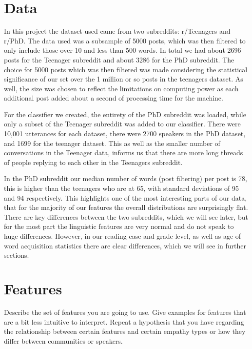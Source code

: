 \documentclass[11pt]{article}
\begin{document}

\section{Data}
In this project the dataset used came from two subreddits: r/Teenagers and r/PhD. The data used was a subsample of 5000 posts, which was then filtered to only include those over 10 and less than 500 words. In total we had about 2696 posts for the Teenager subreddit and about 3286 for the PhD subreddit. The choice for 5000 posts which was then filtered was made considering the statistical significance of our set over the 1 million or so posts in the teenagers dataset. As well, the size was chosen to reflect the limitations on computing power as each additional post added about a second of processing time for the machine. 


For the classifier we created, the entirety of the PhD subreddit was loaded, while only a subset of the Teenager subreddit was added to our classifier. There were 10,001 utterances for each dataset, there were 2700 speakers in the PhD dataset, and 1699 for the teenager dataset. This as well as the smaller number of conversations in the Teenager data, informs us that there are more long threads of people replying to each other in the Teenagers subreddit. 



In the PhD subreddit our median number of words (post filtering) per post is 78, this is higher than the teenagers who are at 65, with standard  deviations of 95 and 94 respectively. This highlights one of the most interesting parts of our data, that for the majority of our features the overall distributions are surprisingly flat. There are key differences between the two subreddits, which we will see later, but for the most part the linguistic features are very normal and do not speak to huge differences. However, in our reading ease and grade level, as well as age of word acquisition statistics there are clear differences, which we will see in further sections. 

\section{Features}
Describe the set of features you are going to use. Give examples for features that are a bit less intuitive to interpret. Repeat a hypothesis that you have regarding the relationship between certain features and certain empathy types or how they differ between communities or speakers. 
\end{document}
